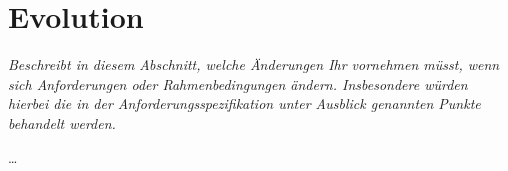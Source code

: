 \documentclass[fontsize=12pt,paper=a4,twoside]{scrartcl}
\begin{document}
\section{Evolution} \label{sec:evolution}

{\itshape Beschreibt in diesem Abschnitt, welche Änderungen Ihr vornehmen müsst,
wenn sich Anforderungen oder Rahmenbedingungen ändern. Insbesondere würden 
hierbei die in der Anforderungsspezifikation unter \glqq{}Ausblick\grqq{} 
genannten Punkte behandelt werden.}

\dots
\end{document}
